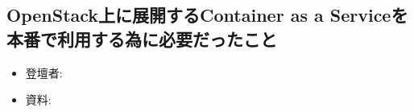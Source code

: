 \begin{center}
  \section*{OpenStack上に展開するContainer as a Serviceを本番で利用する為に必要だったこと}
\end{center}


\begin{flushright}
  \begin{itemize}
  \item   登壇者: 
  \item 資料: 
  \end{itemize}
\end{flushright}
